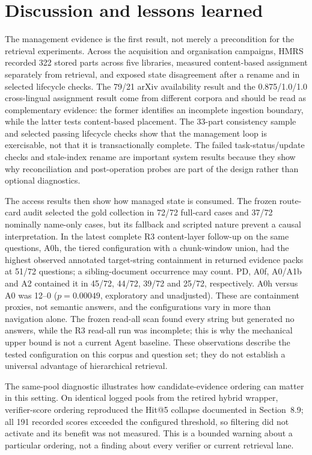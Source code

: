 \documentclass[11pt]{article}
\begin{document}
\section{Discussion and lessons learned}


The management evidence is the first result, not merely a precondition for the
retrieval experiments. Across the acquisition and organisation campaigns, HMRS
recorded 322 stored parts across five libraries, measured content-based
assignment separately from retrieval, and exposed state disagreement after a
rename and in selected lifecycle checks. The 79/21 arXiv availability result
and the 0.875/1.0/1.0 cross-lingual assignment result come from different
corpora and should be read as complementary evidence: the former identifies an
incomplete ingestion boundary, while the latter tests content-based placement.
The 33-part consistency sample and selected passing lifecycle checks show
that the management loop is exercisable, not that it is transactionally
complete. The failed task-status/update checks and stale-index rename are
important system results because they show why reconciliation and post-operation
probes are part of the design rather than optional diagnostics.

The access results then show how managed state is consumed. The frozen route-card
audit selected the gold collection in 72/72 full-card cases and 37/72 nominally
name-only cases, but its fallback and scripted nature prevent a causal
interpretation. In the latest complete R3 content-layer follow-up on the same
questions, A0h, the tiered configuration with a chunk-window union, had the
highest observed annotated target-string containment in returned evidence packs
at 51/72 questions; a sibling-document occurrence may count. PD, A0f, A0/A1b and A2 contained it in
45/72, 44/72, 39/72 and 25/72, respectively. A0h versus A0 was 12--0
($p=0.00049$, exploratory and unadjusted). These are containment proxies, not
semantic answers, and the configurations vary in more than navigation alone.
The frozen read-all scan found every string but generated no answers, while the
R3 read-all run was incomplete; this is why the mechanical upper bound is not a
current Agent baseline. These observations describe the tested configuration
on this corpus and question set; they do not establish a universal advantage of hierarchical
retrieval.

The same-pool diagnostic illustrates how candidate-evidence ordering can matter
in this setting. On identical logged pools from the retired hybrid wrapper,
verifier-score ordering reproduced the Hit@5 collapse documented in
Section~8.9; all 191 recorded scores exceeded the configured
threshold, so filtering did not activate and its benefit was not measured.
This is a bounded warning about a particular ordering, not a finding about
every verifier or current retrieval lane.
\end{document}
